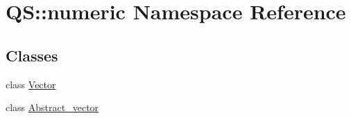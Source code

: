 \hypertarget{namespaceQS_1_1numeric}{\section{Q\-S\-:\-:numeric Namespace Reference}
\label{namespaceQS_1_1numeric}
}
\subsection*{Classes}
\begin{DoxyCompactItemize}
\item 
class \hyperlink{classQS_1_1numeric_1_1Vector}{Vector}
\item 
class \hyperlink{classQS_1_1numeric_1_1Abstract__vector}{Abstract\-\_\-vector}
\end{DoxyCompactItemize}
